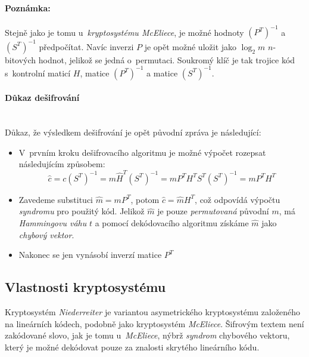 \documentclass[thesis=M,czech,hidelinks]{FITthesis}[2012/06/26]
\newcommand{\0}{{\textcolor[gray]{0.75}{0}}}
\begin{document}
\paragraph{Poznámka:} Stejně jako je tomu u~\emph{kryptosystému McEliece}, je
možné hodnoty $\left(P^T\right)^{-1}$ a $\left(S^T\right)^{-1}$ předpočítat.
Navíc inverzi $P$ je opět možné uložit jako $\log_2 m$ $n$-bitových hodnot,
jelikož se jedná o~permutaci. Soukromý klíč je tak trojice kód s~kontrolní
maticí $H$, matice $\left(P^T\right)^{-1}$ a matice $\left(S^T\right)^{-1}$.


\paragraph{Důkaz dešifrování} \hfill \\
Důkaz, že výsledkem dešifrování je opět původní zpráva je následující:

\begin{itemize}
    \item V~prvním kroku dešifrovacího algoritmu je možné výpočet rozepsat
        následujícím způsobem:
        $$
            \hat{c} =   c \left(S^T\right)^{-1} =
                        m \hat{H}^T \left(S^T\right)^{-1} =
                        m P^T H^T S^T \left(S^T\right)^{-1} =
                        m P^T H^T
        $$

    \item Zavedeme substituci $\hat{m} = m P^T$, potom $\hat{c} = \hat{m} H^T$,
        což odpovídá výpočtu \emph{syndromu} pro použitý kód. Jelikož $\hat{m}$
        je pouze \emph{permutovaná} původní $m$, má \emph{Hammingovu váhu} $t$
        a pomocí dekódovacího algoritmu získáme $\hat{m}$ jako \emph{chybový
        vektor}.

    \item Nakonec se jen vynásobí inverzí matice $P^T$

\end{itemize}


\subsection{Vlastnosti kryptosystému}

Kryptosystém \emph{Niederreiter} je variantou asymetrického kryptosystému
založeného na lineárních kódech, podobně jako kryptosystém \emph{McEliece}.
Šifrovým textem není zakódované slovo, jak je tomu u~\emph{McEliece}, nýbrž
\emph{syndrom} chybového vektoru, který je možné dekódovat pouze za znalosti
skrytého lineárního kódu.
\end{document}

